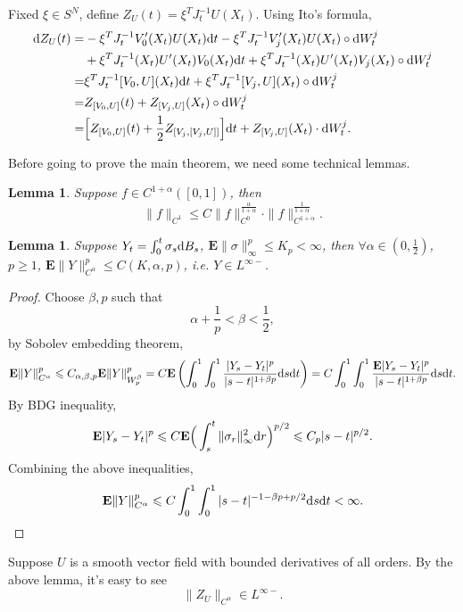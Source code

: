 \documentclass[twoside, 12pt]{book}
\numberwithin{equation}{chapter}
\newtheorem{lemma}[theorem]{Lemma}
\def\bE{{\mathbf E}}
\def\geq{\geqslant}
\def\leq{\leqslant}
\def\d{\text{\rm{d}}}
\begin{document}
	Fixed $\xi\in S^N$, define $Z_U(t)=\xi^T J_t^{-1}U(X_t)$. 
	Using Ito's formula, 
	\begin{equation}
		\begin{split}
			\d Z_U(t)=&-\xi^T J_t^{-1}V'_0(X_t)U(X_t) \d t- \xi^T J_t^{-1}V'_j(X_t) U(X_t) \circ \d W^j_t\\
			&+\xi^T J_t^{-1}(X_t) U'(X_t)V_0(X_t)\d t+\xi^T J_t^{-1}(X_t) U'(X_t) V_j(X_t)\circ\d W^j_t\\
			=& \xi^T J_t^{-1} [V_0, U](X_t)\d t+\xi^T J_t^{-1} [V_j, U](X_t)\circ\d W^j_t\\
			=& Z_{[V_0, U]}(t)+ Z_{[V_j, U]}(X_t)\circ \d W_t^j\\
			=& \Big[Z_{[V_0, U]}(t)+\frac{1}{2} Z_{[V_j, [V_j, U]]}\Big]\d t+ Z_{[V_j, U]}(X_t) \cdot \d W_t^j.
		\end{split}
	\end{equation}
	
	Before going to prove the main theorem, we need some technical lemmas. 
	\begin{lemma}\label{Inter}
	Suppose $f\in C^{1+\alpha }([0,1])$, then 
	$$\|f\|_{C^1}\leq  C \|f\|_{C^0}^{\frac{\alpha }{1+\alpha }}\cdot \|f\|_{C^{1+\alpha }}^{\frac{1}{1+\alpha }}. $$
	\end{lemma}
	
	\begin{lemma}
	Suppose $Y_t=\int_0^t \sigma_s\d B_s$, $\bE  \|\sigma\|_\infty^p\leq K_p<\infty$, then $\forall \alpha \in(0,\frac{1}{2})$, $p\geq 1$, $\bE  \|Y\|_{C^\alpha }^p\leq C(K,\alpha ,p)$, i.e. $Y\in L^{\infty-}$. 
	\end{lemma}
	\begin{proof}
		Choose $\beta, p$ such that
		$$\alpha +\frac{1}{p}<\beta<\frac{1}{2},$$
		by Sobolev embedding theorem, 
		$$\bE  \|Y\|^p_{C^\alpha }\leq C_{\alpha ,\beta,p}\bE  \|Y\|^p_{W^\beta_p}=C \bE \left(\int_0^1\int_0^1 \frac{|Y_s-Y_t|^p}{|s-t|^{1+\beta p}}\d s\d t\right)= C\int_0^1\int_0^1 \frac{\bE  |Y_s-Y_t|^p}{|s-t|^{1+\beta p}}\d s\d t. $$
		By BDG inequality, 
		$$\bE  |Y_s-Y_t|^p\leq C \bE \Big(\int_s^t \|\sigma_r\|_\infty^2\d r\Big )^{p/2}\leq C_p|s-t|^{p/2}.$$
		Combining the above inequalities,  
		$$\bE  \|Y\|^p_{C^\alpha }\leq C \int_0^1 \int_0^1  |s-t|^{-1-\beta p+p/2}\d s\d t<\infty. $$
	\end{proof}
	
	Suppose $U$ is a smooth vector field with bounded derivatives of all orders. By the above lemma, it's easy to see
	$$\|Z_U\|_{C^\alpha }\in L^{\infty-}. $$
	
\end{document}
